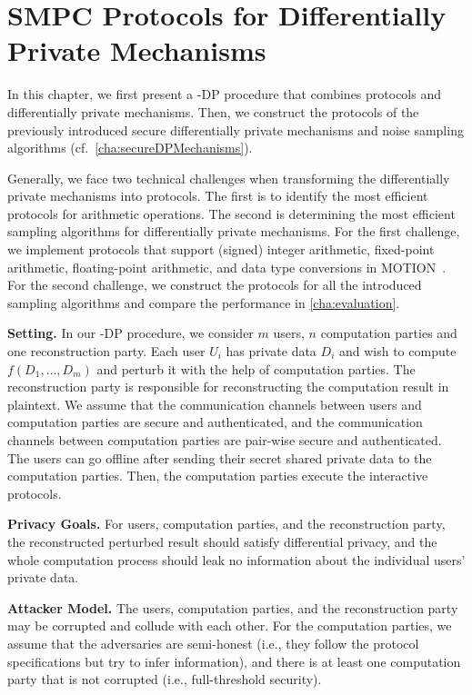 \chapter{SMPC Protocols for Differentially Private Mechanisms}
\label{cha:MPCProtocolsforDifferentiallyPrivateMechanisms}

In this chapter, we first present a \smpc-DP procedure that combines \smpc protocols and differentially private mechanisms.
Then, we construct the \smpc protocols of the previously introduced secure differentially private mechanisms and noise sampling algorithms (cf.~\autoref{cha:secureDPMechanisms}).

Generally, we face two technical challenges when transforming the differentially private mechanisms into \smpc protocols.
The first is to identify the most efficient \smpc protocols for arithmetic operations.
The second is determining the most efficient sampling algorithms for differentially private mechanisms.
For the first challenge, we implement \smpc protocols that support (signed) integer arithmetic, fixed-point arithmetic, floating-point arithmetic, and data type conversions in MOTION~\cite{braun2022motion}.
For the second challenge, we construct the \smpc protocols for all the introduced sampling algorithms and compare the performance in \autoref{cha:evaluation}.

\textbf{Setting.} In our \smpc-DP procedure, we consider $m$ users, $n$ computation parties and one reconstruction party. Each user $U_i$ has private data $D_i$ and wish to compute $f\left(D_1,\ldots, D_m\right) $ and perturb it with the help of computation parties. The reconstruction party is responsible for reconstructing the computation result in plaintext. We assume that the communication channels between users and computation parties are secure and authenticated, and the communication channels between computation parties are pair-wise secure and authenticated. The users can go offline after sending their secret shared private data to the computation parties. Then, the computation parties execute the interactive \smpc protocols.

\textbf{Privacy Goals.} For users, computation parties, and the reconstruction party, the reconstructed perturbed result should satisfy differential privacy, and the whole computation process should leak no information about the individual users' private data.

\textbf{Attacker Model.} The users, computation parties, and the reconstruction party may be corrupted and collude with each other.
For the computation parties, we assume that the adversaries are semi-honest (i.e., they follow the protocol specifications but try to infer information), and there is at least one computation party that is not corrupted (i.e., full-threshold security).

